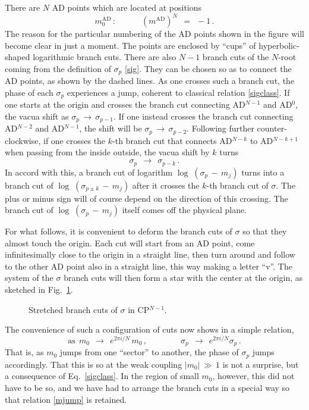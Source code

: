 \documentclass[epsfig,12pt]{article}
\def\beq{\begin{equation}}
\def\eeq{\end{equation}}
\def\beq{\begin{equation}}
\def\eeq{\end{equation}}
\begin{document}
	There are $ N $ AD points which are located at positions
\beq
	m_0^\text{AD} \,: \qquad\quad \left( m^\text{AD} \right)^N ~~=~~ -1 \,.
\eeq
	The reason for the particular numbering of the AD points shown in the figure will become clear in just a moment.
	The points are enclosed by ``cups'' of hyperbolic-shaped logarithmic branch cuts.
	There are also $ N - 1 $ branch cuts of the $ N $-root coming from the definition of $ \sigma_p $ \eqref{sig}.
	They can be chosen so as to connect the AD points, as shown by the dashed lines.
	As one crosses such a branch cut, the phase of each $ \sigma_p $ experiences a jump, 
	coherent to classical relation \eqref{sigclass}. 
	If one starts at the origin and crosses the branch cut connecting AD$^{N-1}$ and AD$^0$, 
	the vacua shift as $ \sigma_p \,\to\, \sigma_{p-1} $.
	If one instead crosses the branch cut connecting AD$^{N-2}$ and AD$^{N-1}$,
	the shift will be $ \sigma_p \,\to\, \sigma_{p-2} $.
	Following further counter-clockwise, if one crosses the $ k $-th branch cut 
	that connects AD$^{N-k}$ to AD$^{N-k+1}$ when passing from the inside outside, the vacua shift by $ k $ turns
\beq
\label{sigshift}
	\sigma_p ~~\to~~ \sigma_{p-k} \,.
\eeq
	In accord with this, a branch cut of logarithm $ \log\;( \sigma_p \,-\, m_j ) $ turns into 
	a branch cut of $ \log\;( \sigma_{p \pm k} \,-\, m_j ) $ after it crosses the $ k $-th branch cut of $ \sigma $. 
	The plus or minus sign will of course depend on the direction of this crossing. 
	The branch cut of $ \log\;( \sigma_p \,-\, m_j ) $ itself comes off the physical plane.

	For what follows, it is convenient to deform the branch cuts of $ \sigma $ so that they almost touch the origin.
	Each cut will start from an AD point, come infinitesimally close to the origin in a straight line, 
	then turn around and follow to the other AD point also in a straight line, this way making a letter ``v''.
	The system of the $ \sigma $ branch cuts will then form a star with the center at the origin, as sketched in Fig.~\ref{fsigcpn}.
\begin{figure}
\begin{center}
\epsfxsize=8.0cm
\caption{Stretched branch cuts of $ \sigma $ in CP$^{N-1}$.}
\label{fsigcpn}
\end{center}
\end{figure}
	The convenience of such a configuration of cuts now shows in a simple relation,
\beq
\label{mjump}
	\text{as}~~ m_0 ~~\to~~ e^{2\pi i / N}\, m_0\,,  \qquad\qquad \sigma_p ~~\to~~ e^{2\pi i / N} \sigma_p\,.
\eeq
	That is, as $ m_0 $ jumps from one ``sector'' to another, the phase of $ \sigma_p $ jumps accordingly.
	That this is so at the weak coupling $ |m_0| \,\gg\, 1 $ is not a surprise, but a consequence of Eq.~\eqref{sigclass}.
	In the region of small $ m_0 $, however, this did not have to be so, and we have had to arrange the branch cuts 
	in a special way so that relation \eqref{mjump} is retained.
\end{document}
